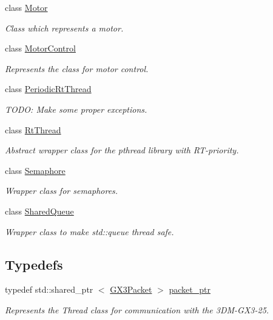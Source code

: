 \begin{DoxyCompactItemize}
class \hyperlink{class_u_s_u_1_1_motor}{\-Motor}
\begin{DoxyCompactList}\small\item\em \-Class which represents a motor. \end{DoxyCompactList}\item 
class \hyperlink{class_u_s_u_1_1_motor_control}{\-Motor\-Control}
\begin{DoxyCompactList}\small\item\em \-Represents the class for motor control. \end{DoxyCompactList}\item 
class \hyperlink{class_u_s_u_1_1_periodic_rt_thread}{\-Periodic\-Rt\-Thread}
\begin{DoxyCompactList}\small\item\em \-T\-O\-D\-O\-: \-Make some proper exceptions. \end{DoxyCompactList}\item 
class \hyperlink{class_u_s_u_1_1_rt_thread}{\-Rt\-Thread}
\begin{DoxyCompactList}\small\item\em \-Abstract wrapper class for the pthread library with \-R\-T-\/priority. \end{DoxyCompactList}\item 
class \hyperlink{class_u_s_u_1_1_semaphore}{\-Semaphore}
\begin{DoxyCompactList}\small\item\em \-Wrapper class for semaphores. \end{DoxyCompactList}\item 
class \hyperlink{class_u_s_u_1_1_shared_queue}{\-Shared\-Queue}
\begin{DoxyCompactList}\small\item\em \-Wrapper class to make std\-::queue thread safe. \end{DoxyCompactList}\end{DoxyCompactItemize}
\subsection*{\-Typedefs}
\begin{DoxyCompactItemize}
\item 
typedef std\-::shared\-\_\-ptr\*
$<$ \hyperlink{class_u_s_u_1_1_g_x3_packet}{\-G\-X3\-Packet} $>$ \hyperlink{group__dm_ga182171f405c2878c86261aab0de61bf5}{packet\-\_\-ptr}
\begin{DoxyCompactList}\small\item\em \-Represents the \-Thread class for communication with the 3\-D\-M-\/\-G\-X3-\/25. \end{DoxyCompactList}\end{DoxyCompactItemize}
